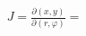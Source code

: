 \documentclass[preview]{standalone}
\begin{document}
\begin{align*}
J = \frac{\partial (x, y)}{\partial (r, \varphi)} =
\end{align*}
\end{document}
